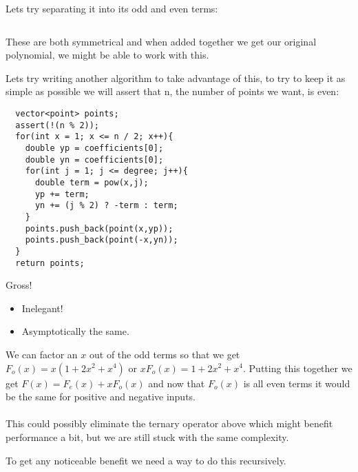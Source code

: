 \documentclass{beamer}
\begin{document}
\begin{frame}
  Lets try separating it into its odd and even terms:

  \begin{columns}
  \end{columns}

  These are both symmetrical and when added together we get our original polynomial, we might be able to work with this.

\end{frame}

\begin{frame}[fragile]

  Lets try writing another algorithm to take advantage of this, to try to keep it as simple as possible we will assert that n, the number of points we want, is even:

  \begin{lstlisting}
  vector<point> points;
  assert(!(n % 2));
  for(int x = 1; x <= n / 2; x++){
    double yp = coefficients[0];
    double yn = coefficients[0];
    for(int j = 1; j <= degree; j++){
      double term = pow(x,j);
      yp += term;
      yn += (j % 2) ? -term : term;
    }
    points.push_back(point(x,yp));
    points.push_back(point(-x,yn));
  }
  return points;
\end{lstlisting}
\end{frame}

\begin{frame}
  Gross!
  \begin{itemize}
    \item Inelegant!
    \item Asymptotically the same.
  \end{itemize}

  We can factor an $x$ out of the odd terms so that we get $F_o(x)=x(1+2x^2+x^4)$ or $x F_o(x)=1+2x^2+x^4$. Putting this together we get $F(x) = F_e(x) + xF_o(x)$ and now that $F_o(x)$ is all even terms it would be the same for positive and negative inputs.\\~\\
  This could possibly eliminate the ternary operator above which might benefit performance a bit, but we are still stuck with the same complexity.

  To get any noticeable benefit we need a way to do this recursively.
\end{frame}
\end{document}
